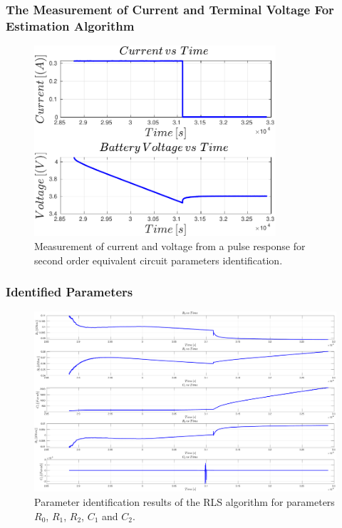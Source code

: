 \documentclass{beamer}
\begin{document}
\begin{frame}
	
	\frametitle{The Measurement of Current and Terminal Voltage For Estimation Algorithm}
	
	\begin{figure}
		\centering
		\includegraphics[width=0.8\textwidth, keepaspectratio]{images/Parameter_Identification_Region.pdf}
		\caption{Measurement of current and voltage
			from a pulse response for second order equivalent circuit parameters identification.}
		\label{fig:Response_to_discharge_pulse_experimental}
	\end{figure}
	
\end{frame}

\begin{frame}
	
	\frametitle{Identified Parameters}
	
	\begin{figure}
		\centering
		\includegraphics[width=\textwidth, keepaspectratio]{images/RLS_Results.pdf}
		\caption{Parameter identification results of the RLS algorithm for parameters $R_{0}$, $R_{1}$, $R_{2}$, $C_{1}$ and $C_{2}$.}
		\label{fig:Results_of_the_RLS_Method}
	\end{figure}	
\end{frame}
\end{document}
